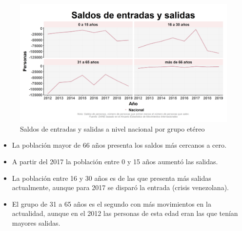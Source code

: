     \begin{figure}[H]
        \caption{Saldos de entradas y salidas a nivel nacional por grupo etéreo \label{map_result_2} }
        \begin{center}
        \includegraphics[width=\textwidth,keepaspectratio]{img/var_238_trend.png}
        \end{center}
    \end{figure}
            \begin{itemize}
                    \item La población mayor de 66 años presenta los saldos más cercanos a cero.
                    \item A partir del 2017 la población entre 0 y 15 años aumentó las salidas.
                    \item La población entre 16 y 30 años es de las que presenta más salidas actualmente, aunque para 2017 se disparó la entrada (crisis venezolana).
                    \item El grupo de 31 a 65 años es el segundo con más movimientos en la actualidad, aunque en el 2012 las personas de esta edad eran las que tenían mayores salidas.
                    \end{itemize}

